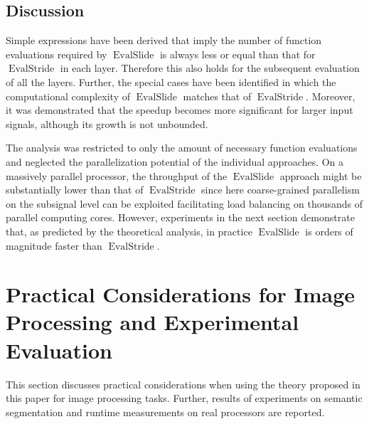 \documentclass[journal]{IEEEtran}
\DeclareMathOperator{\EvalStride}{EvalStride}
\DeclareMathOperator{\EvalSlide}{EvalSlide}
\begin{document}
\subsection{Discussion}
Simple expressions have been derived that imply the number of function evaluations required by $\EvalSlide$ is always less or equal than that for $\EvalStride$ in each layer.
Therefore this also holds for the subsequent evaluation of all the layers.
Further, the special cases have been identified in which the computational complexity of $\EvalSlide$ matches that of $\EvalStride$.
Moreover, it was demonstrated that the speedup becomes more significant for larger input signals, although its growth is not unbounded.

The analysis was restricted to only the amount of necessary function evaluations and neglected the parallelization potential of the individual approaches.
On a massively parallel processor, the throughput of the $\EvalSlide$ approach might be substantially lower than that of $\EvalStride$ since here coarse-grained parallelism on the subsignal level can be exploited facilitating load balancing on thousands of parallel computing cores.
However, experiments in the next section demonstrate that, as predicted by the theoretical analysis, in practice $\EvalSlide$ is orders of magnitude faster than $\EvalStride$.

\section{Practical Considerations for Image Processing and Experimental Evaluation}
\label{sect:experimental_evaluation}
This section discusses practical considerations when using the theory proposed in this paper for image processing tasks.
Further, results of experiments on semantic segmentation and runtime measurements on real processors are reported.
\end{document}
